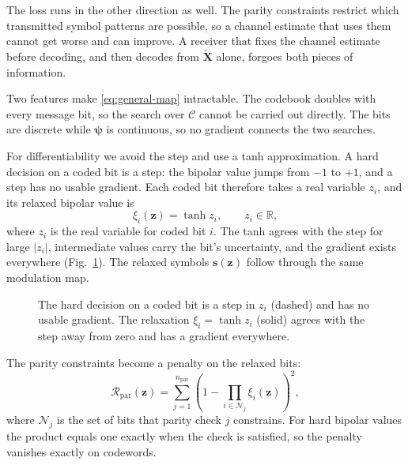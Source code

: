 \documentclass[conference]{IEEEtran}
\newcommand{\R}{\mathbb{R}}
\begin{document}
The loss runs in the other direction as well.  The parity constraints
restrict which transmitted symbol patterns are possible, so a channel
estimate that uses them cannot get worse and can improve.  A receiver that
fixes the channel estimate before decoding, and then decodes from
\(\widetilde{\mathbf X}\) alone, forgoes both pieces of information.

Two features make \eqref{eq:general-map} intractable.  The codebook doubles
with every message bit, so the search over \(\mathcal C\) cannot be carried
out directly.  The bits are discrete while \(\bm\psi\) is continuous, so no
gradient connects the two searches.

For differentiability we avoid the step and use a tanh approximation.  A
hard decision on a coded bit is a step: the bipolar value jumps from \(-1\)
to \(+1\), and a step has no usable gradient.  Each coded bit therefore
takes a real variable \(z_i\), and its relaxed bipolar value is
\begin{equation}
  \xi_i(\mathbf z)=\tanh z_i,
  \qquad z_i\in\R,
  \label{eq:relaxed-bit}
\end{equation}
where \(z_i\) is the real variable for coded bit \(i\).  The tanh agrees
with the step for large \(\left|z_i\right|\), intermediate values carry the
bit's uncertainty, and the gradient exists everywhere
(Fig.~\ref{fig:step-tanh}).  The relaxed symbols \(\mathbf s(\mathbf z)\)
follow through the same modulation map.

\begin{figure}[t]
\centering
{}
\caption{The hard decision on a coded bit is a step in \(z_i\) (dashed) and
has no usable gradient.  The relaxation \(\xi_i=\tanh z_i\) (solid) agrees
with the step away from zero and has a gradient everywhere.}
\label{fig:step-tanh}
\end{figure}

The parity constraints become a penalty on the relaxed bits:
\begin{equation}
  \mathcal R_{\mathrm{par}}(\mathbf z)
  =
  \sum_{j=1}^{n_{\mathrm{par}}}
  \left(1-\prod_{i\in\mathcal N_j}\xi_i(\mathbf z)\right)^{2},
  \label{eq:parity-penalty}
\end{equation}
where \(\mathcal N_j\) is the set of bits that parity check \(j\)
constrains.  For hard bipolar values the product equals one exactly when the
check is satisfied, so the penalty vanishes exactly on codewords.
\end{document}
